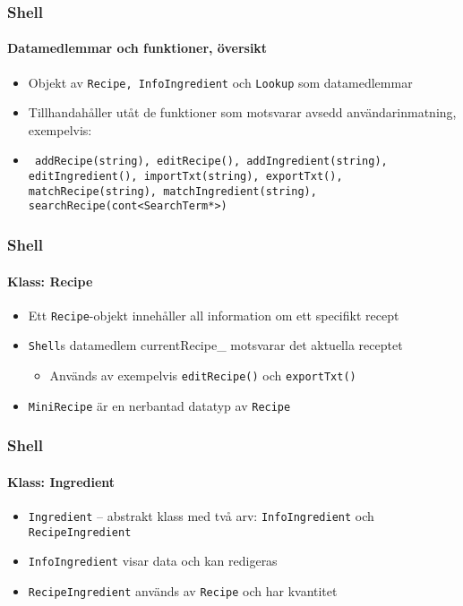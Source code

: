 %
%

\begin{frame}
  \frametitle{Shell}
  \framesubtitle{Datamedlemmar och funktioner, översikt}
  \begin{itemize}
    \item Objekt av \texttt{Recipe, InfoIngredient} och \texttt{Lookup} som datamedlemmar
    \item<2-> Tillhandahåller utåt de funktioner som motsvarar avsedd användarinmatning, exempelvis:
    \item<2-> \texttt{
      addRecipe(string), editRecipe(),
      addIngredient(string), editIngredient(),
      importTxt(string), exportTxt(),
      matchRecipe(string), matchIngredient(string),
      searchRecipe(cont<SearchTerm*>)
    }
  \end{itemize} 
\end{frame}

\begin{frame}
  \frametitle{Shell}
  \framesubtitle{Klass: Recipe}
  \begin{itemize}
  \item Ett \texttt{Recipe}-objekt innehåller all information om ett specifikt recept
  \item<2-> \texttt{Shell}s datamedlem currentRecipe\_ motsvarar det aktuella receptet
    \begin{itemize}
    \item Används av exempelvis \texttt{editRecipe()} och \texttt{exportTxt()}
    \end{itemize}
  \item<3-> \texttt{MiniRecipe} är en nerbantad datatyp av \texttt{Recipe}
  \end{itemize}
\end{frame}

\begin{frame}
  \frametitle{Shell}
  \framesubtitle{Klass: Ingredient}
  \begin{itemize}
  \item \texttt{Ingredient} -- abstrakt klass med två arv: \texttt{InfoIngredient} och \texttt{RecipeIngredient}
  \item<2-> \texttt{InfoIngredient} visar data och kan redigeras
  \item<3-> \texttt{RecipeIngredient} används av \texttt{Recipe} och har kvantitet
  \end{itemize}
\end{frame}

